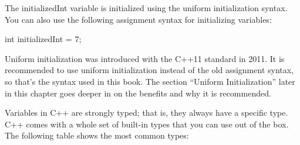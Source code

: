 The initializedInt variable is initialized using the uniform initialization syntax. You can also use the following assignment syntax for initializing variables:

\begin{cpp}
int initializedInt = 7;
\end{cpp}

Uniform initialization was introduced with the C++11 standard in 2011. It is recommended to use uniform initialization instead of the old assignment syntax, so that’s the syntax used in this book. The section “Uniform Initialization” later in this chapter goes deeper in on the benefits and why it is recommended.

Variables in C++ are strongly typed; that is, they always have a specific type. C++ comes with a whole set of built-in types that you can use out of the box. The following table shows the most common types:

